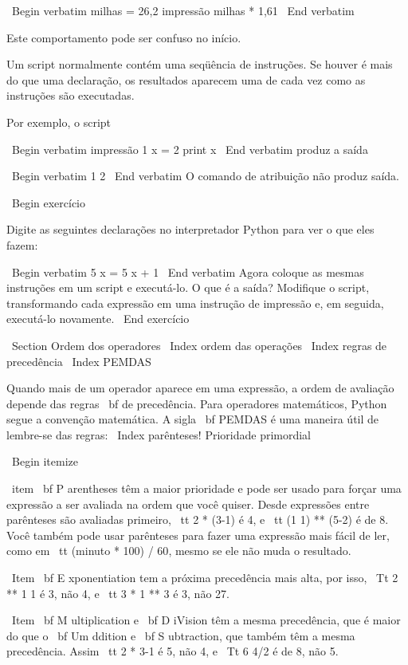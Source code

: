 \documentclass[10pt]{book}
\begin{document}
\begin {itemize}
{\ Begin {verbatim}
milhas = 26,2
impressão milhas * 1,61
\ End {verbatim}

Este comportamento pode ser confuso no início.

Um script normalmente contém uma seqüência de instruções. Se houver
é mais do que uma declaração, os resultados aparecem uma de cada vez
como as instruções são executadas.

Por exemplo, o script

\ Begin {verbatim}
impressão 1
x = 2
print x
\ End {verbatim}
%
produz a saída

\ Begin {verbatim}
1
2
\ End {verbatim}
%
O comando de atribuição não produz saída.

\ Begin {} exercício

Digite as seguintes declarações no interpretador Python para ver
o que eles fazem:

\ Begin {verbatim}
5
x = 5
x + 1
\ End {verbatim}
%
Agora coloque as mesmas instruções em um script e executá-lo. O que
é a saída? Modifique o script, transformando cada
expressão em uma instrução de impressão e, em seguida, executá-lo novamente.
\ End {} exercício


\ Section {Ordem dos operadores}
\ Index {ordem das operações}
\ Index {regras de precedência}
\ Index {} PEMDAS

Quando mais de um operador aparece em uma expressão, a ordem de
avaliação depende das regras {\ bf de precedência}. Para
operadores matemáticos, Python segue a convenção matemática.
A sigla {\ bf PEMDAS} é uma maneira útil de
lembre-se das regras:
\ Index {parênteses! Prioridade primordial}

\ Begin {itemize}

\ item {\ bf P} arentheses têm a maior prioridade e pode ser usado 
para forçar uma expressão a ser avaliada na ordem que você quiser. Desde
expressões entre parênteses são avaliadas primeiro, {\ tt 2 * (3-1)} é 4,
e {\ tt (1 1) ** (5-2)} é de 8. Você também pode usar parênteses para fazer uma
expressão mais fácil de ler, como em {\ tt (minuto * 100) / 60}, mesmo
se ele não muda o resultado.

\ Item {\ bf E} xponentiation tem a próxima precedência mais alta, por isso,
{\ Tt 2 ** 1 1} é 3, não 4, e {\ tt 3 * 1 ** 3} é 3, não 27.

\ Item {\ bf M} ultiplication e {\ bf D} iVision têm a mesma precedência,
que é maior do que o {\ bf Um ddition} e {\ bf S} ubtraction, que também
têm a mesma precedência. Assim {\ tt 2 * 3-1} é 5, não 4, e
{\ Tt 6 4/2} é de 8, não 5.

}
\end{itemize}
\end{document}
